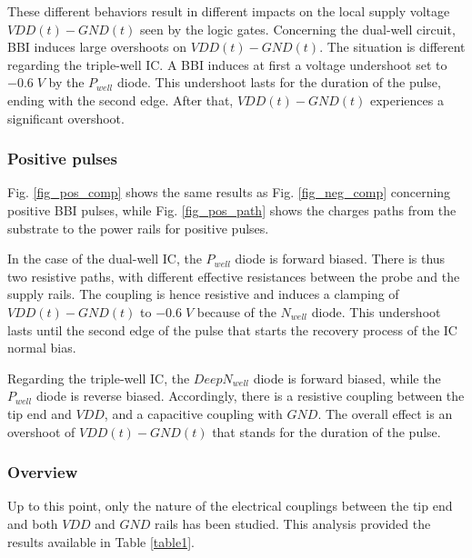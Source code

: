 \documentclass[10pt, conference, compsocconf]{IEEEtran}
\begin{document}
These different behaviors result in different impacts on the local supply voltage $VDD(t) - GND(t)$ seen by the logic gates. Concerning the dual-well circuit, BBI induces large overshoots on $VDD(t) - GND(t)$. The situation is different regarding the triple-well IC. A BBI induces at first a voltage undershoot set to $-0.6\; V$ by the $P_{well}$ diode. This undershoot lasts for the duration of the pulse, ending with the second edge. After that, $VDD(t) - GND(t)$ experiences a significant overshoot.

\subsubsection{Positive pulses}
Fig. \ref{fig_pos_comp} shows the same results as Fig. \ref{fig_neg_comp} concerning positive BBI pulses, while Fig. \ref{fig_pos_path} shows the charges paths from the substrate to the power rails for positive pulses.

In the case of the dual-well IC, the $P_{well}$ diode is forward biased. There is thus two resistive paths, with different effective resistances between the probe and the supply rails. The coupling is hence resistive and induces a clamping of $VDD(t) - GND(t)$ to $-0.6 \; V$ because of the $N_{well}$ diode. This undershoot lasts until the second edge of the pulse that starts the recovery process of the IC normal bias.

Regarding the triple-well IC, the $Deep N_{well}$ diode is forward biased, while the $P_{well}$ diode is reverse biased. Accordingly, there is a resistive coupling between the tip end and $VDD$, and a capacitive coupling with $GND$. The overall effect is an overshoot of $VDD(t) - GND(t)$ that stands for the duration of the pulse.

\subsubsection{Overview}
Up to this point, only the nature of the electrical couplings between the tip end and both $VDD$ and $GND$ rails has been studied. This analysis provided the results available in Table \ref{table1}.
\end{document}
